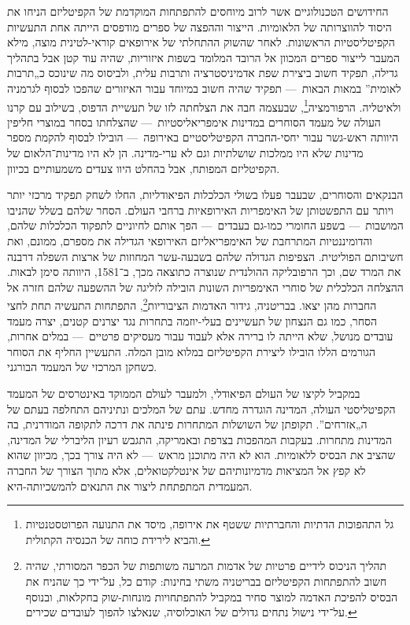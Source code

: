 החידושים הטכנולוגיים אשר לרוב מיוחסים להתפתחות המוקדמת של הקפיטליזם הניחו את היסוד להווצרותה של הלאומיות. הייצור וההפצה של ספרים מודפסים הייתה אחת התעשיות הקפיטליסטיות הראשונות. לאחר שהשוק ההתחלתי של אירופאים קוראי-לטינית מוצה, מילא המעבר לייצור ספרים המכוון אל הרובד המלומד בשפות איזוריות, שהיה עוד קטן אבל בתהליך גדילה, תפקיד חשוב ביצירת שפת אדמיניסטרציה ותרבות עלית, ולביסוס מה שינוכס כ„תרבות לאומית” במאות הבאות~— תפקיד שהיה חשוב במיוחד עבור האיזורים שהפכו לבסוף לגרמניה ולאיטליה. הרפורמציה\footnote{גל התהפוכות הדתיות והחברתיות ששטף את אירופה, מיסד את התנועה הפרוטסטנטיות והביא לירידת כוחה של הכנסיה הקתולית.}, שבעצמה חבה את הצלחתה לזו של תעשיית הדפוס, בשילוב עם קרנו העולה של מעמד הסוחרים במדינות אימפריאליסטיות~— שהצלחתו בסחר במוצרי חליפין היוותה ראש-גשר עבור יחסי-החברה הקפיטליסטיים באירופה~— הובילו לבסוף להקמת מספר מדינות שלא היו ממלכות שושלתיות וגם לא ערי-מדינה. הן לא היו מדינות־הלאום של הקפיטליזם המפותח, אבל בהחלט היוו צעדים משמעותיים בכיוון.

הבנקאים והסוחרים, שבעבר פעלו בשולי הכלכלות הפיאודליות, החלו לשחק תפקיד מרכזי יותר ויותר עם התפשטותן של האימפריות האירופאיות ברחבי העולם. הסחר שלהם בשלל שהניבו המושבות~— בשפע החומרי כמו-גם בעבדים~— הפך אותם לחיוניים לתפקוד הכלכלות שלהם, והדומיננטיות המתרחבת של האימפריאליזם האירופאי הגדילה את מספרם, ממונם, ואת חשיבותם הפוליטית. הצפיפות הגדולה שלהם בשבעה-עשר המחוזות של ארצות השפלה דרבנה את המרד שם, וכך הרפובליקה ההולנדית שנוצרה כתוצאה מכך, ב־1581, היוותה סימן לבאות. ההצלחה הכלכלית של סוחרי האימפריות השונות הובילה לזליגה של ההשפעה שלהם חזרה אל החברות מהן יצאו. בבריטניה, גידור האדמות הציבוריות\footnote{תהליך הניכוס לידיים פרטיות של אדמות המרעה משותפות של הכפר המסורתי, שהיה חשוב להתפתחות הקפיטליזם בבריטניה משתי בחינות: קודם כל, על־ידי כך שהניח את הבסיס להפיכת האדמה למוצר סחיר במקביל להתפתחויות מונחות-שוק בחקלאות, ובנוסף על־ידי נישול נתחים גדולים של האוכלוסיה, שנאלצו להפוך לעובדים שכירים.}, התפתחות התעשיה תחת לחצי הסחר, כמו גם הנצחון של תעשיינים בעלי-יוזמה בתחרות נגד יצרנים קטנים, יצרה מעמד עובדים מנושל, שלא הייתה לו ברירה אלא לעבוד עבור מעסיקים פרטיים~— במלים אחרות, הגורמים הללו הובילו ליצירת הקפיטליזם במלוא מובן המלה. התעשיין החליף את הסוחר כשחקן המרכזי של המעמד הבורגני.

במקביל לקיצו של העולם הפיאודלי, ולמעבר לעולם הממוקד באינטרסים של המעמד הקפיטליסטי העולה, המדינה הוגדרה מחדש. עתם של המלכים ונתיניהם התחלפה בעתם של ה„אזרחים”. תקופתן של השושלות המתחרות פינתה את דרכה לתקופה המודרנית, בה המדינות מתחרות. בעקבות המהפכות בצרפת ובאמריקה, התגבש רעיון הליברלי של המדינה, שהציב את הבסיס ללאומיות. הוא לא היה מתוכנן מראש~— לא היה צורך בכך, מכיוון שהוא לא קפץ אל המציאות מדמיונותיהם של אינטלקטואלים, אלא מתוך הצורך של החברה המעמדית המתפתחת ליצור את התנאים להמשכיותה-היא.

